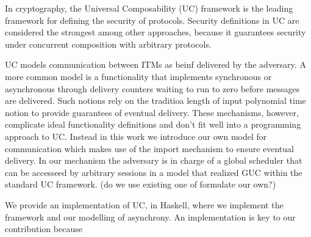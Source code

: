 In cryptography, the Universal Composability (UC) framework is the leading framework for defining the security of protocols.
Security definitions in UC are considered the strongest among other approaches, because it guarantees security under concurrent composition with arbitrary protocols.




UC models communication between ITMs as beinf delivered by the adversary.
A more common model is a functionality that implements synchronous or asynchronous through delivery counters waiting to run to zero before messages are delivered.
Such notions rely on the traditioa length of input polynomial time notion to provide guarantees of eventual delivery.
These mechanisms, however, complicate ideal functionality definitions and don't fit well into a programming approach to UC.
Instead in this work we introduce our own model for communication which makes use of the import mechanism to ensure eventual delivery.
In our mechanism the adversary is in charge of a global scheduler that can be accesseed by arbitrary sessions in a model that realized GUC within the standard UC framework. 
(do we use existing one of formulate our own?)

We provide an implementation of UC, in Haskell, where we implement the framework and our modelling of asynchrony.
An implementation is key to our contribution because
